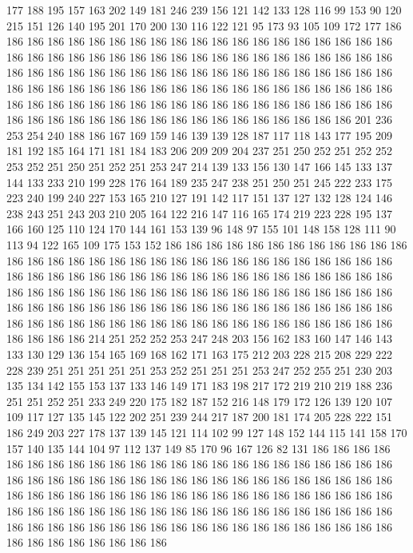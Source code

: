 177 188 195 157 163 202 149 181 246 239 156 121 142 133 128 116 99 153 90 120
215 151 126 140 195 201 170 200 130 116 122 121 95 173 93 105 109 172 177 186
186 186 186 186 186 186 186 186 186 186 186 186 186 186 186 186 186 186 186 186
186 186 186 186 186 186 186 186 186 186 186 186 186 186 186 186 186 186 186 186
186 186 186 186 186 186 186 186 186 186 186 186 186 186 186 186 186 186 186 186
186 186 186 186 186 186 186 186 186 186 186 186 186 186 186 186 186 186 186 186
186 186 186 186 186 186 186 186 186 186 186 186 186 186 186 186 186 186 186 186
186 186 186 186 186 186 186 186 186 186 186 186 201 236 253 254 240 188 186 167
169 159 146 139 139 128 187 117 118 143 177 195 209 181 192 185 164 171 181 184
183 206 209 209 204 237 251 250 252 251 252 252 253 252 251 250 251 252 251 253
247 214 139 133 156 130 147 166 145 133 137 144 133 233 210 199 228 176 164 189
235 247 238 251 250 251 245 222 233 175 223 240 199 240 227 153 165 210 127 191
142 117 151 137 127 132 128 124 146 238 243 251 243 203 210 205 164 122 216 147
116 165 174 219 223 228 195 137 166 160 125 110 124 170 144 161 153 139 96 148
97 155 101 148 158 128 111 90 113 94 122 165 109 175 153 152 186 186 186 186
186 186 186 186 186 186 186 186 186 186 186 186 186 186 186 186 186 186 186 186
186 186 186 186 186 186 186 186 186 186 186 186 186 186 186 186 186 186 186 186
186 186 186 186 186 186 186 186 186 186 186 186 186 186 186 186 186 186 186 186
186 186 186 186 186 186 186 186 186 186 186 186 186 186 186 186 186 186 186 186
186 186 186 186 186 186 186 186 186 186 186 186 186 186 186 186 186 186 186 186
186 186 186 186 186 186 186 214 251 252 252 253 247 248 203 156 162 183 160 147
146 143 133 130 129 136 154 165 169 168 162 171 163 175 212 203 228 215 208 229
222 228 239 251 251 251 251 251 253 252 251 251 251 253 247 252 255 251 230 203
135 134 142 155 153 137 133 146 149 171 183 198 217 172 219 210 219 188 236 251
251 252 251 233 249 220 175 182 187 152 216 148 179 172 126 139 120 107 109 117
127 135 145 122 202 251 239 244 217 187 200 181 174 205 228 222 151 186 249 203
227 178 137 139 145 121 114 102 99 127 148 152 144 115 141 158 170 157 140 135
144 104 97 112 137 149 85 170 96 167 126 82 131 186 186 186 186 186 186 186
186 186 186 186 186 186 186 186 186 186 186 186 186 186 186 186 186 186 186 186
186 186 186 186 186 186 186 186 186 186 186 186 186 186 186 186 186 186 186 186
186 186 186 186 186 186 186 186 186 186 186 186 186 186 186 186 186 186 186 186
186 186 186 186 186 186 186 186 186 186 186 186 186 186 186 186 186 186 186 186
186 186 186 186 186 186 186 186 186 186 186 186 186 186 186 186 186 186 186 186
